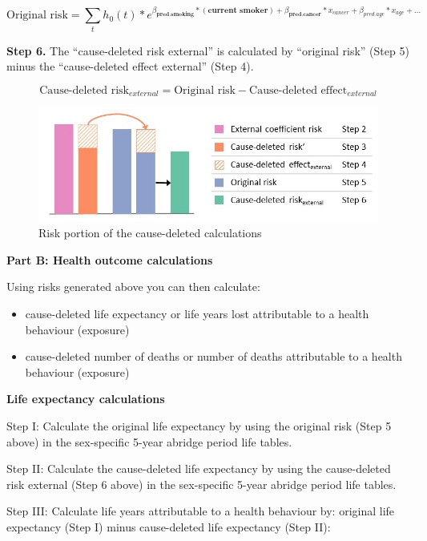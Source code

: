 \documentclass[]{book}
\providecommand{\tightlist}{%
  \setlength{\itemsep}{0pt}\setlength{\parskip}{0pt}}
\begin{document}
\[ \text{Original risk} = \sum_t h_0(t) * e^{{\beta_\textbf{pred.smoking}}*{(\textbf{current smoker})}+{\beta_\textbf{pred.cancer}}*x_{cancer} + \beta_{pred.age}*x_{age} +...}  \]

\textbf{Step 6.} The ``cause-deleted risk external'' is calculated by
``original risk'' (Step 5) minus the ``cause-deleted effect external''
(Step 4).

\[\text{Cause-deleted risk}_{ external} = \text{Original risk} - \text{Cause-deleted effect}_{external}\]

\begin{figure}

{\centering \includegraphics{Method2 only -cbf} 

}

\caption{Risk portion of the cause-deleted calculations}\label{fig:unnamed-chunk-11}
\end{figure}

\textbf{Part B: Health outcome calculations}

Using risks generated above you can then calculate:

\begin{itemize}
\tightlist
\item
  cause-deleted life expectancy or life years lost attributable to a
  health behaviour (exposure)
\item
  cause-deleted number of deaths or number of deaths attributable to a
  health behaviour (exposure)
\end{itemize}

\textbf{Life expectancy calculations}

Step I: Calculate the original life expectancy by using the original
risk (Step 5 above) in the sex-specific 5-year abridge period life
tables.

Step II: Calculate the cause-deleted life expectancy by using the
cause-deleted risk external (Step 6 above) in the sex-specific 5-year
abridge period life tables.

Step III: Calculate life years attributable to a health behaviour by:
original life expectancy (Step I) minus cause-deleted life expectancy
(Step II):
\end{document}
